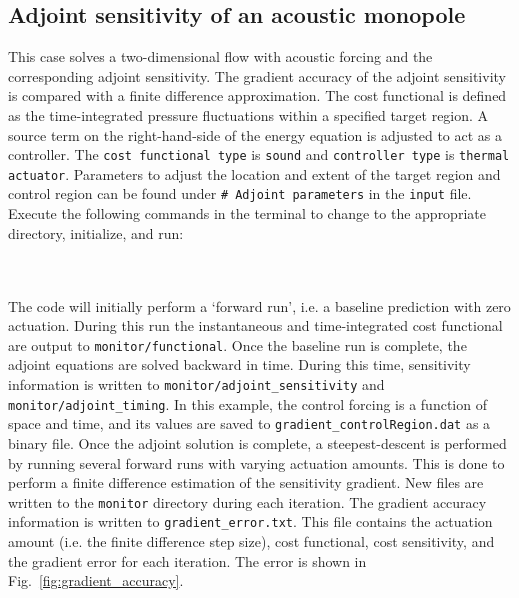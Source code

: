 \documentclass[12pt]{article}
\newcommand{\code}[1]{\texttt{#1}}
\begin{document}
\subsection{Adjoint sensitivity of an acoustic monopole}
This case solves a two-dimensional flow with acoustic forcing and the corresponding adjoint sensitivity. The gradient accuracy of the adjoint sensitivity is compared with a finite difference approximation. The cost functional is defined as the time-integrated pressure fluctuations within a specified target region. A source term on the right-hand-side of the energy equation is adjusted to act as a controller. The \code{cost functional type} is \code{sound} and \code{controller type} is \code{thermal actuator}. Parameters to adjust the location and extent of the target region and control region can be found under \code{\# Adjoint parameters} in the \code{input} file. Execute the following commands in the terminal to change to the appropriate directory, initialize, and run:
\\\\
\vspace{1em}
\vspace{.5em}
\\
The code will initially perform a `forward run', i.e. a baseline prediction with zero actuation. During this run the instantaneous and time-integrated cost functional are output to \code{monitor/functional}. Once the baseline run is complete, the adjoint equations are solved backward in time. During this time, sensitivity information is written to \code{monitor/adjoint\_sensitivity} and \code{monitor/adjoint\_timing}. In this example, the control forcing is a function of space and time, and its values are saved to \code{gradient\_controlRegion.dat} as a binary file. Once the adjoint solution is complete, a steepest-descent is performed by running several forward runs with varying actuation amounts. This is done to perform a finite difference estimation of the sensitivity gradient. New files are written to the \code{monitor} directory during each iteration. The gradient accuracy information is written to \code{gradient\_error.txt}. This file contains the actuation amount (i.e. the finite difference step size), cost functional, cost sensitivity, and the gradient error for each iteration. The error is shown in Fig.~\ref{fig:gradient_accuracy}.
\end{document}
